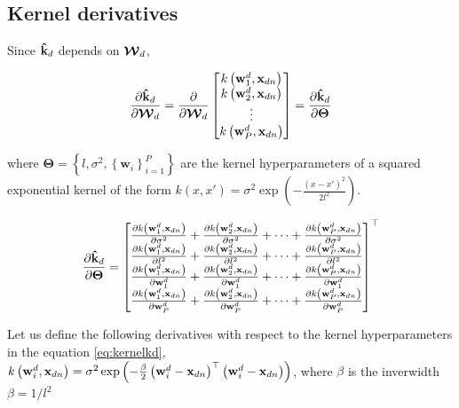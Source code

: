 	
	
	
	\subsection{Kernel derivatives}
	
	
	
	
	Since $\mathbf{\hat{k}}_d$ depends on $\boldsymbol{\mathcal{W}}_d$,
	
	\begin{align}
	\frac{\partial \mathbf{\hat{k}}_d}{\partial\boldsymbol{\mathcal{W}}_d} = \frac{\partial }{\partial\boldsymbol{\mathcal{W}}_d} \left[ \begin{matrix}
	k\left(\mathbf{w}_{1}^d,\mathbf{x}_{dn}\right)\\
	k\left(\mathbf{w}_{2}^d,\mathbf{x}_{dn}\right)\\
	\vdots\\
	k\left(\mathbf{w}_{P}^d,\mathbf{x}_{dn}\right) 
	\end{matrix}\right]  = \frac{\partial \mathbf{\hat{k}}_d}{\partial \boldsymbol{\Theta}}
	\end{align}
	
	where $\boldsymbol{\Theta}=\left\{l,\sigma^2,\left\{\mathbf{w}_i\right\}_{i=1}^{P}\right\}$ are the kernel hyperparameters of a squared exponential kernel of the form $k\left(x,x'\right)=\sigma^2\exp\left(-\frac{\left(x-x'\right)^2}{2l^2}\right)$.
	
	\begin{align}
	\frac{\partial \mathbf{\hat{k}}_d}{\partial \boldsymbol{\Theta}} = \left[ \begin{matrix}
	\frac{\partial k\left(\mathbf{w}_{1}^d,\mathbf{x}_{dn}\right)}{\partial \sigma^2} +  \frac{\partial k\left(\mathbf{w}_{2}^d,\mathbf{x}_{dn}\right)}{\partial \sigma^2} + \cdots + \frac{\partial k\left(\mathbf{w}_{P}^d,\mathbf{x}_{dn}\right)}{\partial \sigma^2} \\
	\frac{\partial k\left(\mathbf{w}_{1}^d,\mathbf{x}_{dn}\right)}{\partial l^2} +  \frac{\partial k\left(\mathbf{w}_{2}^d,\mathbf{x}_{dn}\right)}{\partial l^2} + \cdots + \frac{\partial k\left(\mathbf{w}_{P}^d,\mathbf{x}_{dn}\right)}{\partial l^2} \\
	\frac{\partial k\left(\mathbf{w}_{1}^d,\mathbf{x}_{dn}\right)}{\partial \mathbf{w}_{1}^d} + \frac{\partial k\left(\mathbf{w}_{2}^d,\mathbf{x}_{dn}\right)}{\partial \mathbf{w}_{1}^d}  + \cdots+ \frac{\partial k\left(\mathbf{w}_{P}^d,\mathbf{x}_{dn}\right)}{\partial \mathbf{w}_{1}^d} \\
	\frac{\partial k\left(\mathbf{w}_{1}^d,\mathbf{x}_{dn}\right)}{\partial \mathbf{w}_{P}^d} + \frac{\partial k\left(\mathbf{w}_{2}^d,\mathbf{x}_{dn}\right)}{\partial \mathbf{w}_{P}^d}+\cdots+\frac{\partial k\left(\mathbf{w}_{P}^d,\mathbf{x}_{dn}\right)}{\partial \mathbf{w}_{P}^d}\\
	\end{matrix}\right] ^\top
	\label{eq:kernelkd}
	\end{align}
	
	Let us define the following derivatives with respect to the kernel hyperparameters in the equation \eqref{eq:kernelkd}, $k\left(\mathbf{w}_{i}^d,\mathbf{x}_{dn}\right)=\sigma^2\exp\left(-\frac{\beta}{2}\left(\mathbf{w}_i^d-\mathbf{x}_{dn}\right)^\top\left(\mathbf{w}_i^d-\mathbf{x}_{dn}\right)\right)$, where $\beta$ is the inverwidth $\beta = 1/l^2$
	
